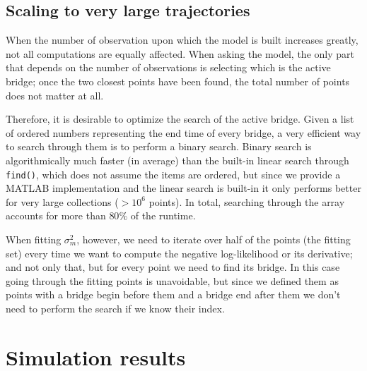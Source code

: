 \documentclass[12pt]{article}
\begin{document}

\subsection{Scaling to very large trajectories}

When the number of observation upon which the model is built increases greatly, not all computations are equally affected. When asking the model, the only part that depends on the number of observations is selecting which is the active bridge; once the two closest points have been found, the total number of points does not matter at all.

Therefore, it is desirable to optimize the search of the active bridge. Given a list of ordered numbers representing the end time of every bridge, a very efficient way to search through them is to perform a binary search. Binary search is algorithmically much faster (in average) than the built-in linear search through \texttt{find()}, which does not assume the items are ordered, but since we provide a MATLAB implementation and the linear search is built-in it only performs better for very large collections ($>10^6$ points). In total, searching through the array accounts for more than $80\%$ of the runtime.

When fitting $\sigma_m^2$, however, we need to iterate over half of the points (the fitting set) every time we want to compute the negative log-likelihood or its derivative; and not only that, but for every point we need to find its bridge. In this case going through the fitting points is unavoidable, but since we defined them as points with a bridge begin before them and a bridge end after them we don't need to perform the search if we know their index.


\section{Simulation results}
\end{document}
